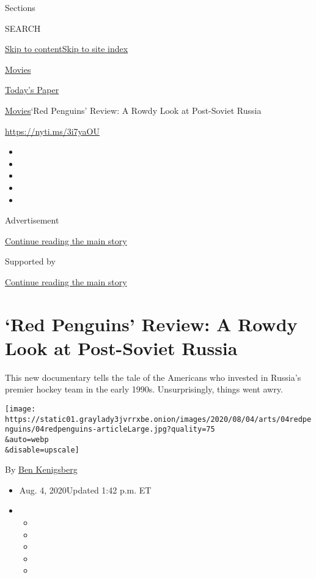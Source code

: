 Sections

SEARCH

\protect\hyperlink{site-content}{Skip to
content}\protect\hyperlink{site-index}{Skip to site index}

\href{https://www.nytimes3xbfgragh.onion/section/movies}{Movies}

\href{https://myaccount.nytimes3xbfgragh.onion/auth/login?response_type=cookie\&client_id=vi}{}

\href{https://www.nytimes3xbfgragh.onion/section/todayspaper}{Today's
Paper}

\href{/section/movies}{Movies}\textbar{}`Red Penguins' Review: A Rowdy
Look at Post-Soviet Russia

\url{https://nyti.ms/3i7yaOU}

\begin{itemize}
\item
\item
\item
\item
\item
\end{itemize}

Advertisement

\protect\hyperlink{after-top}{Continue reading the main story}

Supported by

\protect\hyperlink{after-sponsor}{Continue reading the main story}

\hypertarget{red-penguins-review-a-rowdy-look-at-post-soviet-russia}{%
\section{`Red Penguins' Review: A Rowdy Look at Post-Soviet
Russia}\label{red-penguins-review-a-rowdy-look-at-post-soviet-russia}}

This new documentary tells the tale of the Americans who invested in
Russia's premier hockey team in the early 1990s. Unsurprisingly, things
went awry.

\texttt{[image: https://static01.graylady3jvrrxbe.onion/images/2020/08/04/arts/04redpenguins/04redpenguins-articleLarge.jpg?quality=75\\\&auto=webp\\\&disable=upscale]}

By \href{https://www.nytimes3xbfgragh.onion/by/ben-kenigsberg}{Ben
Kenigsberg}

\begin{itemize}
\item
  Aug. 4, 2020Updated 1:42 p.m. ET
\item
  \begin{itemize}
  \item
  \item
  \item
  \item
  \item
  \end{itemize}
\end{itemize}

